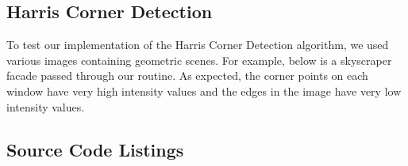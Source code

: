 \documentclass{article}
\begin{document}
\subsection{Harris Corner Detection}
To test our implementation of the Harris Corner Detection algorithm, we used various images containing geometric scenes.  For example, below is a skyscraper facade passed through our routine.  As expected, the corner points on each window have very high intensity values and the edges in the image have very low intensity values.
\begin{center}
\end{center}

\newpage
\begin{appendices}
\section{Source Code Listings}\label{source}
% 







\end{appendices}
\end{document}
